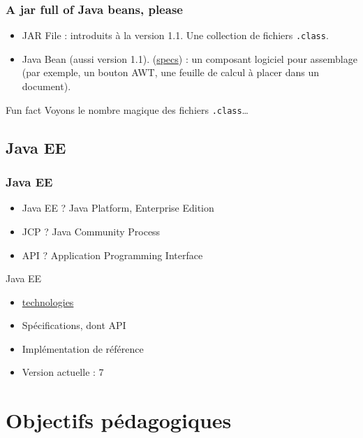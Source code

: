 \documentclass[english, french]{beamer}
\begin{document}
\begin{frame}
	\frametitle{A jar full of Java beans, please}
	\begin{itemize}
		\item JAR File : introduits à la version 1.1. Une collection de fichiers \texttt{.class}.
		\item Java Bean (aussi version 1.1). (\href{http://www.oracle.com/technetwork/java/javase/documentation/spec-136004.html}{specs}) : un composant logiciel pour assemblage (par exemple, un bouton AWT, une feuille de calcul à placer dans un document).
	\end{itemize}
	\begin{block}{Fun fact}
		Voyons le nombre magique des fichiers \texttt{.class}…
	\end{block}
\end{frame}

\subsection{Java EE}
\begin{frame}
	\frametitle{Java EE}
	\begin{itemize}
		\item Java EE ? \pause Java Platform, Enterprise Edition \pause
		\item JCP ? \pause Java Community Process \pause
		\item API ? \pause Application Programming Interface \pause
	\end{itemize}
	\begin{block}{Java EE}
		\begin{itemize}
			\item \href{http://www.oracle.com/technetwork/java/javaee/tech/index.html}{technologies}
			\item Spécifications, dont API
			\item Implémentation de référence
			\item Version actuelle : 7
		\end{itemize}
	\end{block}
\end{frame}

\section{Objectifs pédagogiques}
\end{document}
